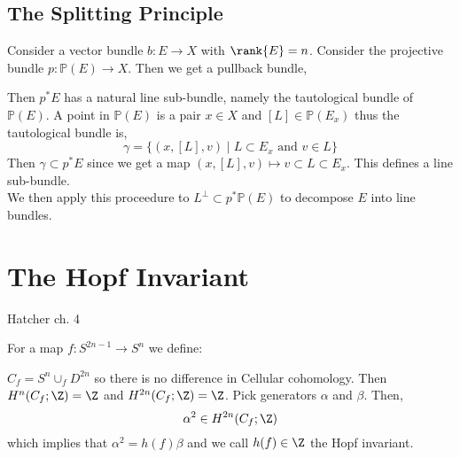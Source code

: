 \documentclass[12pt]{extarticle}
\begin{document}
\subsection{The Splitting Principle}

\renewcommand{\P}{\mathbb{P}}

Consider a vector bundle $b : E \to X$ with $\rank{E} = n$. Consider the projective bundle $p : \P(E) \to X$. Then we get a pullback bundle,
\begin{center}
\end{center}
Then $p^* E$ has a natural line sub-bundle, namely the tautological bundle of $\P(E)$. A point in $\P(E)$ is a pair $x \in X$ and $[L] \in \P(E_x)$ thus the tautological bundle is,
\[ \gamma = \{(x, [L], v) \mid L \subset E_x \text{ and } v \in L \} \]
Then $\gamma \subset p^* E$ since we get a map $(x, [L], v) \mapsto v \subset L \subset E_x$. This defines a line sub-bundle.
\bigskip\\
We then apply this proceedure to $L^\perp \subset p^* \P(E)$ to decompose $E$ into line bundles. 

\section{The Hopf Invariant}

\newcommand{\HP}{\mathbb{HP}}
\newcommand{\OP}{\mathbb{OP}}

Hatcher ch. 4

For a map $f : S^{2n - 1} \to S^n$ we define:

\begin{defn}
$C_f = S^n \cup_f D^{2n}$ so there is no difference in Cellular cohomology. Then $H^n(C_f; \Z) = \Z$ and $H^{2n}(C_f; \Z) = \Z$. Pick generators $\alpha$ and $\beta$. Then,
\[ \alpha^2 \in H^{2n}(C_f; \Z) \]
which implies that $\alpha^2 = h(f) \beta$ and we call $h(f) \in \Z$ the Hopf invariant. 
\end{defn}
\end{document}
